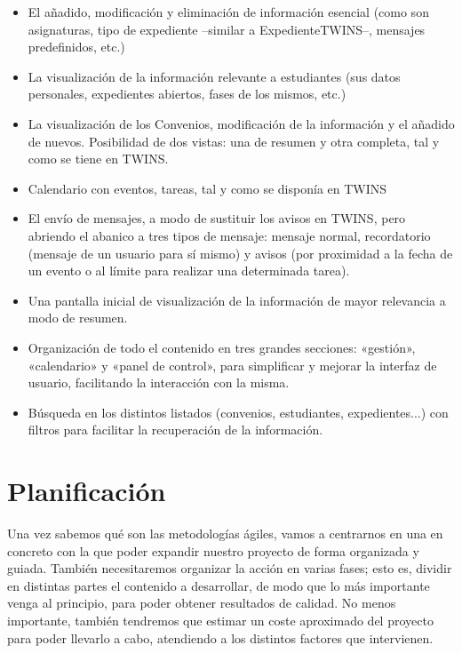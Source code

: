 \begin{itemize}
	\item El añadido, modificación y eliminación de información esencial (como son asignaturas, tipo de expediente --similar a \gls{ExpedienteTWINS}--, mensajes predefinidos, etc.)
	\item La visualización de la información relevante a estudiantes (sus datos personales, expedientes abiertos, fases de los mismos, etc.)
	\item La visualización de los \glspl{Convenio}, modificación de la información y el añadido de nuevos. Posibilidad de dos vistas: una de resumen y otra completa, tal y como se tiene en TWINS.
	\item Calendario con eventos, tareas, tal y como se disponía en TWINS
	\item El envío de mensajes, a modo de sustituir los avisos en TWINS, pero abriendo el abanico a tres tipos de mensaje: mensaje normal, recordatorio (mensaje de un usuario para sí mismo) y avisos (por proximidad a la fecha de un evento o al límite para realizar una determinada tarea).
	\item Una pantalla inicial de visualización de la información de mayor relevancia a modo de resumen. 
	\item Organización de todo el contenido en tres grandes secciones: «gestión», «calendario» y «panel de control», para simplificar y mejorar la interfaz de usuario, facilitando la interacción con la misma.
	\item Búsqueda en los distintos listados (convenios, estudiantes, expedientes...) con filtros para facilitar la recuperación de la información.
\end{itemize}



\section{Planificación}
\label{sec:planificacion}

Una vez sabemos qué son las metodologías ágiles, vamos a centrarnos en una en concreto con la que poder expandir nuestro proyecto de forma organizada y guiada. También necesitaremos organizar la acción en varias fases; esto es, dividir en distintas partes el contenido a desarrollar, de modo que lo más importante venga al principio, para poder obtener resultados de calidad. No menos importante, también tendremos que estimar un coste aproximado del proyecto para poder llevarlo a cabo, atendiendo a los distintos factores que intervienen.


